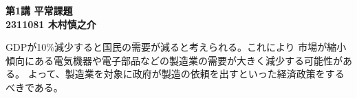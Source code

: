 \documentclass[uplatex,dvipdfmx,a4paper,10pt]{jsarticle}
\makeatletter
\def\section{\@startsection {section}{1}{\z@}{-3.5ex plus -1ex minus -.2ex}{2.3ex plus .2ex}{\Large\bf}}
\makeatother
\begin{document}
    \begin{center}
        {\Large{\bf 第1講 平常課題}} \\
        {\bf 2311081 木村慎之介} \\
    \end{center}

    \hspace{1em}GDPが10\%減少すると国民の需要が減ると考えられる。これにより
    市場が縮小傾向にある電気機器や電子部品などの製造業の需要が大きく減少する可能性がある。
    よって、製造業を対象に政府が製造の依頼を出すといった経済政策をするべきである。

    
    
    
    
\end{document}
